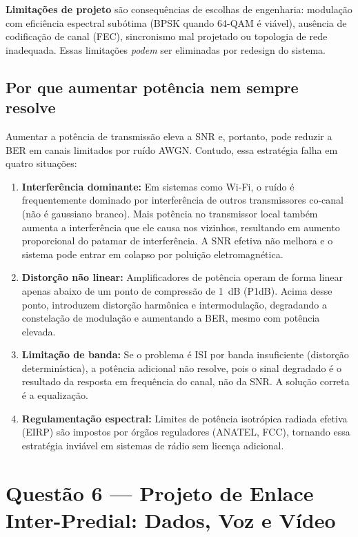\documentclass[conference]{IEEEtran}
\begin{document}
\textbf{Limitações de projeto} são consequências de escolhas de engenharia: modulação com
eficiência espectral subótima (BPSK quando 64-QAM é viável), ausência de codificação de
canal (FEC), sincronismo mal projetado ou topologia de rede inadequada. Essas limitações
\textit{podem} ser eliminadas por redesign do sistema.

\subsection*{Por que aumentar potência nem sempre resolve}

Aumentar a potência de transmissão eleva a SNR e, portanto, pode reduzir a BER em canais
limitados por ruído AWGN. Contudo, essa estratégia falha em quatro situações:

\begin{enumerate}
\item \textbf{Interferência dominante:} Em sistemas como Wi-Fi, o ruído é frequentemente
dominado por interferência de outros transmissores co-canal (não é gaussiano branco). Mais
potência no transmissor local também aumenta a interferência que ele causa nos vizinhos,
resultando em aumento proporcional do patamar de interferência. A SNR efetiva não melhora
e o sistema pode entrar em colapso por poluição eletromagnética.

\item \textbf{Distorção não linear:} Amplificadores de potência operam de forma linear apenas
abaixo de um ponto de compressão de 1~dB (P1dB). Acima desse ponto, introduzem distorção
harmônica e intermodulação, degradando a constelação de modulação e aumentando a BER, mesmo
com potência elevada.

\item \textbf{Limitação de banda:} Se o problema é ISI por banda insuficiente (distorção
determinística), a potência adicional não resolve, pois o sinal degradado é o resultado da
resposta em frequência do canal, não da SNR. A solução correta é a equalização.

\item \textbf{Regulamentação espectral:} Limites de potência isotrópica radiada efetiva
(EIRP) são impostos por órgãos reguladores (ANATEL, FCC), tornando essa estratégia
inviável em sistemas de rádio sem licença adicional.
\end{enumerate}

\section*{Questão 6 — Projeto de Enlace Inter-Predial: Dados, Voz e Vídeo}
\end{document}
